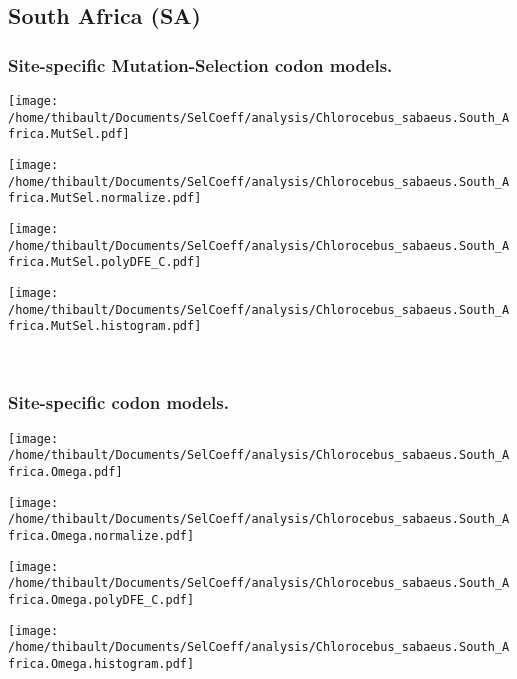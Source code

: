 \subsection{South Africa (SA)} 
 
\subsubsection*{Site-specific Mutation-Selection codon models.} 
\begin{minipage}{0.49\linewidth} 
\texttt{[image: /home/thibault/Documents/SelCoeff/analysis/Chlorocebus\_sabaeus.South\_Africa.MutSel.pdf]} 
\end{minipage}
\begin{minipage}{0.49\linewidth} 
\texttt{[image: /home/thibault/Documents/SelCoeff/analysis/Chlorocebus\_sabaeus.South\_Africa.MutSel.normalize.pdf]} 
\end{minipage}
\begin{minipage}{0.49\linewidth} 
\texttt{[image: /home/thibault/Documents/SelCoeff/analysis/Chlorocebus\_sabaeus.South\_Africa.MutSel.polyDFE\_C.pdf]} 
\end{minipage}
\begin{minipage}{0.49\linewidth} 
\texttt{[image: /home/thibault/Documents/SelCoeff/analysis/Chlorocebus\_sabaeus.South\_Africa.MutSel.histogram.pdf]} 
\end{minipage}
\\ 
\subsubsection*{Site-specific codon models.} 
\begin{minipage}{0.49\linewidth} 
\texttt{[image: /home/thibault/Documents/SelCoeff/analysis/Chlorocebus\_sabaeus.South\_Africa.Omega.pdf]} 
\end{minipage}
\begin{minipage}{0.49\linewidth} 
\texttt{[image: /home/thibault/Documents/SelCoeff/analysis/Chlorocebus\_sabaeus.South\_Africa.Omega.normalize.pdf]} 
\end{minipage}
\begin{minipage}{0.49\linewidth} 
\texttt{[image: /home/thibault/Documents/SelCoeff/analysis/Chlorocebus\_sabaeus.South\_Africa.Omega.polyDFE\_C.pdf]} 
\end{minipage}
\begin{minipage}{0.49\linewidth} 
\texttt{[image: /home/thibault/Documents/SelCoeff/analysis/Chlorocebus\_sabaeus.South\_Africa.Omega.histogram.pdf]} 
\end{minipage}
\\ 
